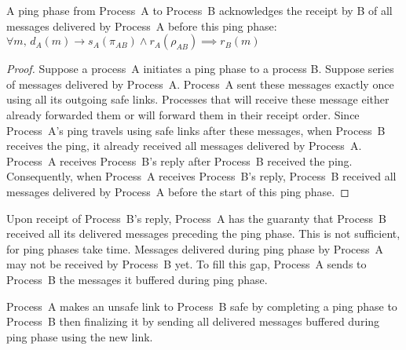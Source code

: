 \begin{lemma}
  A ping phase from Process~A to Process~B acknowledges the receipt by B of all
  messages delivered by Process~A before this ping phase:
  $\forall m,\, d_A(m) \rightarrow s_A(\pi_{AB}) \wedge r_A(\rho_{AB}) \implies
  r_B(m)$
\end{lemma}

\begin{proof}
  Suppose a process~A initiates a ping phase to a process B. Suppose series of
  messages delivered by Process~A. Process~A sent these messages exactly once
  using all its outgoing safe links. Processes that will receive these message
  either already forwarded them or will forward them in their receipt
  order. Since Process~A's ping travels using safe links after these messages,
  when Process~B receives the ping, it already received all messages delivered
  by Process~A. Process~A receives Process~B's reply after Process~B received
  the ping. Consequently, when Process~A receives Process~B's reply, Process~B
  received all messages delivered by Process~A before the start of this ping
  phase.
\end{proof}

Upon receipt of Process~B's reply, Process~A has the guaranty that Process~B
received all its delivered messages preceding the ping phase. This is not
sufficient, for ping phases take time. Messages delivered during ping phase by
Process~A may not be received by Process~B yet. To fill this gap, Process~A
sends to Process~B the messages it buffered during ping phase.


\begin{lemma}
  Process~A makes an unsafe link to Process~B safe by completing a ping phase to
  Process~B then finalizing it by sending all delivered messages buffered during
  ping phase using the new link.
\end{lemma}

